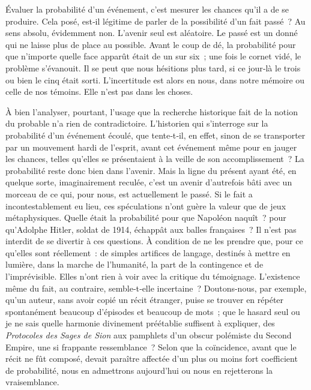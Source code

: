 \documentclass[french,twoside]{book} %
\begin{document}
\noindent Évaluer la probabilité d’un événement, c’est mesurer les chances qu’il a de se produire. Cela posé, est‑il légitime de parler de la possibilité d’un fait passé ? Au sens absolu, évidemment non. L’avenir seul est aléatoire. Le passé est un donné qui ne laisse plus de place au possible. Avant le coup de dé, la probabilité pour que n’importe quelle face apparût était de un sur six ; une fois le cornet vidé, le problème s’évanouit. Il se peut que nous hésitions plus tard, si ce jour‑là le trois ou bien le cinq était sorti. L’incertitude est alors en nous, dans notre mémoire ou celle de nos témoins. Elle n’est pas dans les choses.\par
À bien l’analyser, pourtant, l’usage que la recherche historique fait de la notion du probable n’a rien de contradictoire. L’historien qui s’in­terroge sur la probabilité d’un événement écoulé, que tente‑t‑il, en effet, sinon de se transporter par un mouvement hardi de l’esprit, avant cet événement même pour en jauger les chances, telles qu’elles se présentaient à la veille de son accomplissement ? La probabilité reste donc bien dans l’avenir. Mais la ligne du présent ayant été, en quelque sorte, imaginaire­ment reculée, c’est un avenir d’autrefois bâti avec un morceau de ce qui, pour nous, est actuellement le passé. Si le fait a incontestablement eu lieu, ces spéculations n’ont guère la valeur que de jeux métaphysiques. Quelle était la probabilité pour que Napoléon naquît ? pour qu’Adolphe Hitler, soldat de 1914, échappât aux balles françaises ? Il n’est pas interdit de se divertir à ces questions. À condition de ne les prendre que, pour ce qu’elles sont réellement : de simples artifices de langage, destinés à mettre en lumière, dans la marche de l’humanité, la part de la contingence et de l’imprévisible. Elles n’ont rien à voir avec la critique du témoignage. L’existence même du fait, au contraire, semble‑t‑elle incertaine ? Doutons-­nous, par exemple, qu’un auteur, sans avoir copié un récit étranger, puise se trouver en répéter spontanément beaucoup d’épisodes et beaucoup de mots ; que le hasard seul ou je ne sais quelle harmonie divinement pré­établie suffisent à expliquer, des \emph{Protocoles des Sages de Sion} aux pam­phlets d’un obscur polémiste du Second Empire, une si frappante res­semblance ? Selon que la coïncidence, avant que le récit ne fût composé,  
\label{p61} devait paraître affectée d’un plus ou moins fort coefficient de probabilité, nous en admettrons aujourd’hui ou nous en rejetterons la vraisemblance.\par
\end{document}
